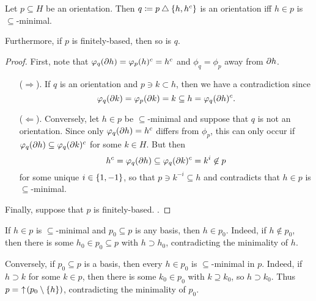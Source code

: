 \documentclass{amsart}
\begin{document}
    \begin{lemma}\label{tree-well-defined}
        Let $p\subseteq H$ be an orientation. Then $q\coloneqq p\bigtriangleup\left\{h,h^c\right\}$ is an orientation iff $h\in p$ is $\subseteq$-minimal.

        Furthermore, if $p$ is finitely-based, then so is $q$.
    \end{lemma}
    \begin{proof}
        First, note that $\varphi_q(\partial h)=\varphi_p(h)^c=h^c$ and $\phi_q=\phi_p$ away from $\partial h$.
        \begin{itemize}
            \item[($\Rightarrow$).] If $q$ is an orientation and $p\ni k\subset h$, then we have a contradiction since
                \begin{equation*}
                    \varphi_q(\partial k)=\varphi_p(\partial k)=k\subseteq h=\varphi_q(\partial h)^c.
                \end{equation*}
            \item[($\Leftarrow$).]Conversely, let $h\in p$ be $\subseteq$-minimal and suppose that $q$ is not an orientation. Since only $\varphi_q(\partial h)=h^c$ differs from $\phi_p$, this can only occur if $\varphi_q(\partial h)\subseteq\varphi_q(\partial k)^c$ for some $k\in H$. But then
                \begin{equation*}
                    h^c=\varphi_q(\partial h)\subseteq\varphi_q(\partial k)^c=k^i\not\in p
                \end{equation*}
                for some unique $i\in\left\{1,-1\right\}$, so that $p\ni k^{-i}\subseteq h$ and contradicts that $h\in p$ is $\subseteq$-minimal.
        \end{itemize}
        Finally, suppose that $p$ is finitely-based. {\color{red}{???}}.
    \end{proof}

    \begin{remark}\label{minimal-iff_basis}
        If $h\in p$ is $\subseteq$-minimal and $p_0\subseteq p$ is any basis, then $h\in p_0$. Indeed, if $h\not\in p_0$, then there is some $h_0\in p_0\subseteq p$ with $h\supset h_0$, contradicting the minimality of $h$.

        Conversely, if $p_0\subseteq p$ is a basis, then every $h\in p_0$ is $\subseteq$-minimal in $p$. Indeed, if $h\supset k$ for some $k\in p$, then there is some $k_0\in p_0$ with $k\supseteq k_0$, so $h\supset k_0$. Thus $p=\,\,\uparrow\!(p_0\setminus\left\{h\right\})$, contradicting the minimality of $p_0$.
    \end{remark}
\end{document}

